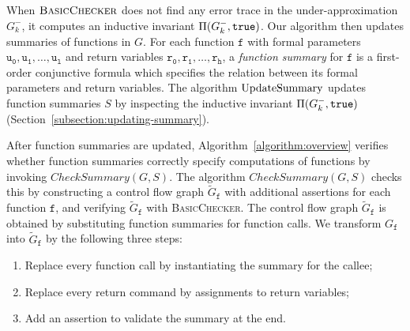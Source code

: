 When $\textsc{BasicChecker}$ does not find any error trace in the
under-approximation $G^-_k$, it computes an inductive
invariant $\Pi (G^-_k, \mathtt{true})$. Our algorithm then updates
summaries of functions in $G$. For each function $\mathtt{f}$ with
formal parameters $\mathtt{u_0}, \mathtt{u_1}, \ldots, \mathtt{u_l}$
and return variables $\mathtt{r_0}, \mathtt{r_1}, \ldots, \mathtt{r_h}$, a \emph{function summary} for $\mathtt{f}$ is a
first-order conjunctive formula which specifies the relation between
its formal parameters and return variables. The algorithm
$\textmd{UpdateSummary}$ updates function summaries $S$ by inspecting
the inductive invariant $\Pi (G^-_k, \mathtt{true})$
(Section~\ref{subsection:updating-summary}). 

After function summaries are updated, Algorithm~\ref{algorithm:overview} 
verifies whether function summaries correctly specify computations of
functions by invoking $\mathit{CheckSummary} (G, S)$. The algorithm
$\mathit{CheckSummary} (G, S)$ checks this by constructing a control flow 
graph $\tilde{G}_{\mathtt{f}}$ with additional assertions for each
function $\mathtt{f}$, and verifying $\tilde{G}_{\mathtt{f}}$ with
\textsc{BasicChecker}. The control flow graph
$\tilde{G}_{\mathtt{f}}$ is obtained by substituting function
summaries for function calls.
We transform $G_{\mathtt{f}}$ into $\tilde{G}_{\mathtt{f}}$ by the
following three steps:
\begin{enumerate}
\item Replace every function call by instantiating the summary for the
  callee;
\item Replace every return command by assignments to return variables;
\item Add an assertion to validate the summary at the end.
\end{enumerate}
